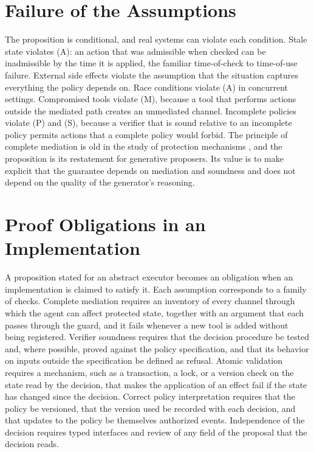 \section{Failure of the Assumptions}

The proposition is conditional, and real systems can violate each condition. Stale state violates (A): an action that was admissible when checked can be inadmissible by the time it is applied, the familiar time-of-check to time-of-use failure. External side effects violate the assumption that the situation captures everything the policy depends on. Race conditions violate (A) in concurrent settings. Compromised tools violate (M), because a tool that performs actions outside the mediated path creates an unmediated channel. Incomplete policies violate (P) and (S), because a verifier that is sound relative to an incomplete policy permits actions that a complete policy would forbid. The principle of complete mediation is old in the study of protection mechanisms \cite{saltzer1975,anderson1972}, and the proposition is its restatement for generative proposers. Its value is to make explicit that the guarantee depends on mediation and soundness and does not depend on the quality of the generator's reasoning.

\section{Proof Obligations in an Implementation}

A proposition stated for an abstract executor becomes an obligation when an implementation is claimed to satisfy it. Each assumption corresponds to a family of checks. Complete mediation requires an inventory of every channel through which the agent can affect protected state, together with an argument that each passes through the guard, and it fails whenever a new tool is added without being registered. Verifier soundness requires that the decision procedure be tested and, where possible, proved against the policy specification, and that its behavior on inputs outside the specification be defined as refusal. Atomic validation requires a mechanism, such as a transaction, a lock, or a version check on the state read by the decision, that makes the application of an effect fail if the state has changed since the decision. Correct policy interpretation requires that the policy be versioned, that the version used be recorded with each decision, and that updates to the policy be themselves authorized events. Independence of the decision requires typed interfaces and review of any field of the proposal that the decision reads.

